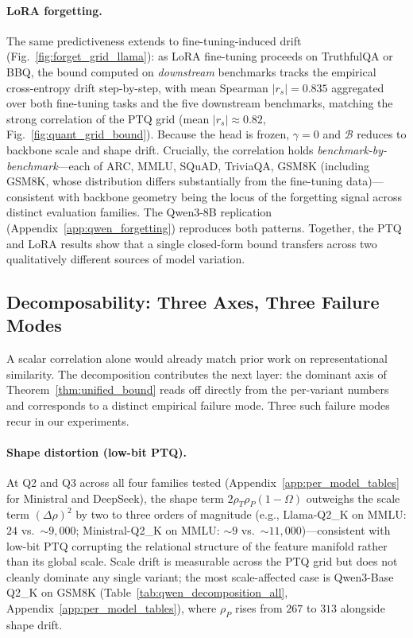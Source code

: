 \documentclass{article}
\begin{document}
\paragraph{LoRA forgetting.}
The same predictiveness extends to fine-tuning-induced drift (Fig.~\ref{fig:forget_grid_llama}): as LoRA fine-tuning proceeds on TruthfulQA or BBQ, the bound computed on \emph{downstream} benchmarks tracks the empirical cross-entropy drift step-by-step, with mean Spearman $|r_s|{=}0.835$ aggregated over both fine-tuning tasks and the five downstream benchmarks, matching the strong correlation of the PTQ grid (mean $|r_s|{\approx}0.82$, Fig.~\ref{fig:quant_grid_bound}). Because the head is frozen, $\gamma{=}0$ and $\mathcal{B}$ reduces to backbone scale and shape drift. Crucially, the correlation holds \emph{benchmark-by-benchmark}---each of ARC, MMLU, SQuAD, TriviaQA, GSM8K (including GSM8K, whose distribution differs substantially from the fine-tuning data)---consistent with backbone geometry being the locus of the forgetting signal across distinct evaluation families. The Qwen3-8B replication (Appendix~\ref{app:qwen_forgetting}) reproduces both patterns. Together, the PTQ and LoRA results show that a single closed-form bound transfers across two qualitatively different sources of model variation.


\subsection{Decomposability: Three Axes, Three Failure Modes}
\label{subsec:decompose}

A scalar correlation alone would already match prior work on representational similarity. The decomposition contributes the next layer: the dominant axis of Theorem~\ref{thm:unified_bound} reads off directly from the per-variant numbers and corresponds to a distinct empirical failure mode. Three such failure modes recur in our experiments.

\paragraph{Shape distortion (low-bit PTQ).}
At Q2 and Q3 across all four families tested (Appendix~\ref{app:per_model_tables} for Ministral and DeepSeek), the shape term $2\rho_T\rho_P(1{-}\Omega)$ outweighs the scale term $(\Delta\rho)^2$ by two to three orders of magnitude (e.g., Llama-Q2\_K on MMLU: $24$ vs.\ $\sim$$9{,}000$; Ministral-Q2\_K on MMLU: $\sim$$9$ vs.\ $\sim$$11{,}000$)---consistent with low-bit PTQ corrupting the relational structure of the feature manifold rather than its global scale. Scale drift is measurable across the PTQ grid but does not cleanly dominate any single variant; the most scale-affected case is Qwen3-Base Q2\_K on GSM8K (Table~\ref{tab:qwen_decomposition_all}, Appendix~\ref{app:per_model_tables}), where $\rho_P$ rises from $267$ to $313$ alongside shape drift.
\end{document}
